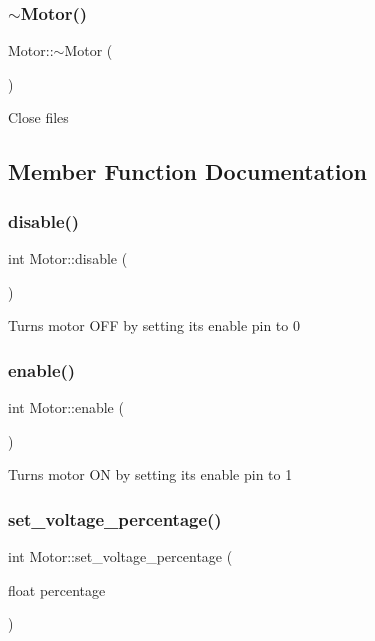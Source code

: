 \subsubsection{\texorpdfstring{$\sim$\+Motor()}{~Motor()}}
{\footnotesize\ttfamily Motor\+::$\sim$\+Motor (\begin{DoxyParamCaption}{ }\end{DoxyParamCaption})\hspace{0.3cm}{\ttfamily [virtual]}}

Close files 

\subsection{Member Function Documentation}
\mbox{\label{classMotor_ac019bca262791cea21e1c84c9156d199}} 
\subsubsection{\texorpdfstring{disable()}{disable()}}
{\footnotesize\ttfamily int Motor\+::disable (\begin{DoxyParamCaption}{ }\end{DoxyParamCaption})}

Turns motor O\+FF by setting its enable pin to 0 \mbox{\label{classMotor_aff58309122a4ba7ea4d037e288c9192f}} 
\subsubsection{\texorpdfstring{enable()}{enable()}}
{\footnotesize\ttfamily int Motor\+::enable (\begin{DoxyParamCaption}{ }\end{DoxyParamCaption})}

Turns motor ON by setting its enable pin to 1 \mbox{\label{classMotor_a7fda59cead716e5cd5ce252741d3d47b}} 
\subsubsection{\texorpdfstring{set\+\_\+voltage\+\_\+percentage()}{set\_voltage\_percentage()}}
{\footnotesize\ttfamily int Motor\+::set\+\_\+voltage\+\_\+percentage (\begin{DoxyParamCaption}\item[{float}]{percentage }\end{DoxyParamCaption})}

